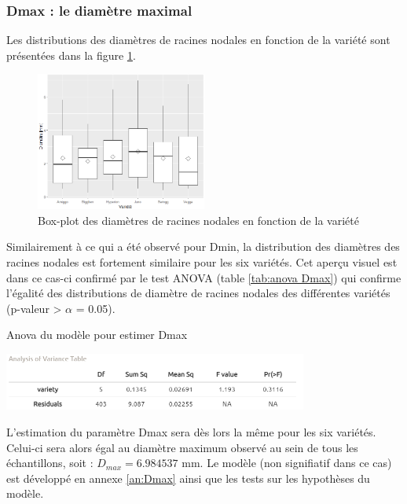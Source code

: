 \subsubsection{Dmax : le diamètre maximal}

Les distributions des diamètres de racines nodales en fonction de la variété sont présentées dans la figure \ref{fig:boxplot Dmax}.

\begin{figure}[ht]
\centering
\includegraphics[width=0.5\textwidth]{Image/boxplot Dmax.png}
\caption{Box-plot des diamètres de racines nodales en fonction de la variété}
\label{fig:boxplot Dmax}
\end{figure}
\newpage

Similairement à ce qui a été observé pour Dmin, la distribution des diamètres des racines nodales est fortement similaire pour les six variétés.
Cet aperçu visuel est dans ce cas-ci confirmé par le test ANOVA (table \ref{tab:anova Dmax}) qui confirme l'égalité des distributions de diamètre de racines nodales des différentes variétés (p-valeur > $\alpha$ = 0.05).

\begin{table}[!ht]
    \centering
    \caption{Anova du modèle pour estimer Dmax}
    \includegraphics[width=0.75\textwidth]{Image/anova Dmax.png}
    \label{tab:anova Dmax}
\end{table}

L'estimation du paramètre Dmax sera dès lors la même pour les six variétés.
Celui-ci sera alors égal au diamètre maximum observé au sein de tous les échantillons, soit : $D_{max} = 6.984537$ mm.
Le modèle (non signifiatif dans ce cas) est développé en annexe \ref{an:Dmax} ainsi que les tests sur les hypothèses du modèle.

